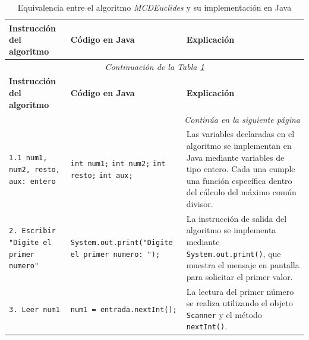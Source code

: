 \documentclass[12pt,twoside]{book}
\begin{document}
					\begin{landscape}
						
						\begin{longtable}{p{6cm} p{6cm} p{7.5cm}}
							
							\caption{Equivalencia entre el algoritmo \textit{MCDEuclides} y su implementación en Java}
							\label{tab:equivalenciaMCD} \\
							
							\toprule
							\textbf{Instrucción del algoritmo} & \textbf{Código en Java} & \textbf{Explicación} \\
							\midrule
							\endfirsthead
							
							\multicolumn{3}{c}{\textit{Continuación de la Tabla \ref{tab:equivalenciaMCD}}} \\
							\toprule
							\textbf{Instrucción del algoritmo} & \textbf{Código en Java} & \textbf{Explicación} \\
							\midrule
							\endhead
							
							\midrule
							\multicolumn{3}{r}{\textit{Continúa en la siguiente página}} \\
							\endfoot
							
							\bottomrule
							\endlastfoot
							
							\texttt{1.1 num1, num2, resto, aux: entero}
							&
							\texttt{int num1;} \newline
							\texttt{int num2;} \newline
							\texttt{int resto;} \newline
							\texttt{int aux;}
							&
							Las variables declaradas en el algoritmo se implementan en Java mediante variables de tipo entero. Cada una cumple una función específica dentro del cálculo del máximo común divisor. \\
							
							\texttt{2. Escribir "Digite el primer numero"}
							&
							\texttt{System.out.print("Digite el primer numero: ");}
							&
							La instrucción de salida del algoritmo se implementa mediante \texttt{System.out.print()}, que muestra el mensaje en pantalla para solicitar el primer valor. \\
							
							\texttt{3. Leer num1}
							&
							\texttt{num1 = entrada.nextInt();}
							&
							La lectura del primer número se realiza utilizando el objeto \texttt{Scanner} y el método \texttt{nextInt()}. \\
							

\end{longtable}
\end{landscape}
\end{document}
